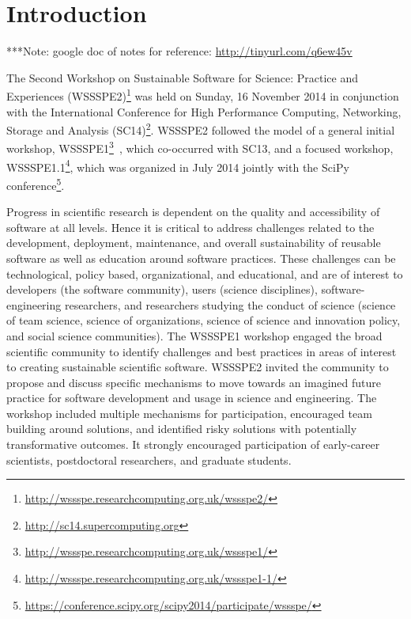 \documentclass[11pt, oneside]{amsart}
\newcommand{\note}[1]{ {\textcolor{blueish}    { ***Note:      #1 }}}
\newcommand{\katznote}[1]{ {\textcolor{magenta}    { ***Dan:      #1 }}}
\newcommand{\gabnote}[1]{ {\textcolor{cyan}    { ***Gabrielle:     #1 }}}
\newcommand{\nchnote}[1]{  {\textcolor{orange}      { ***Neil: #1 }}}
\newcommand{\manishnote}[1]{  {\textcolor{violet}     { ***Manish: #1 }}}
\newcommand{\davidnote}[1]{  {\textcolor{darkgreen}      { ***David: #1 }}}
\begin{document}
\maketitle


\section{Introduction}

%
%
%
%


\note{google doc of notes for reference: \url{http://tinyurl.com/q6ew45v}}

The Second Workshop on Sustainable Software for Science: Practice and
Experiences
(WSSSPE2)\footnote{\url{http://wssspe.researchcomputing.org.uk/wssspe2/}} was
held on Sunday, 16 November 2014 in conjunction with the International
Conference for High Performance Computing, Networking, Storage and Analysis
(SC14)\footnote{\url{http://sc14.supercomputing.org}}. WSSSPE2 followed the
model of a general initial workshop,
WSSSPE1\footnote{\url{http://wssspe.researchcomputing.org.uk/wssspe1/}}~\cite{WSSSPE1-pre-report,WSSSPE1},
which co-occurred with SC13, and a focused workshop,
WSSSPE1.1\footnote{\url{http://wssspe.researchcomputing.org.uk/wssspe1-1/}},
which was organized in July 2014 jointly with the SciPy 
conference\footnote{\url{https://conference.scipy.org/scipy2014/participate/wssspe/}}.

Progress in scientific research is dependent on the quality and accessibility of
software at all levels. Hence it is critical to address challenges related to
the development, deployment, maintenance, and overall sustainability of reusable
software as well as education around software practices. These challenges can be
technological, policy based, organizational, and educational, and are of
interest to developers (the software community), users (science disciplines),
software-engineering researchers, and researchers studying the conduct of
science (science of team science, science of organizations, science of science
and innovation policy, and social science communities). The WSSSPE1 workshop
engaged the broad scientific community to identify challenges and best practices
in areas of interest to creating sustainable scientific software. WSSSPE2
invited the community to propose and discuss specific mechanisms to move towards
an imagined future practice for software development and usage in science and
engineering. The workshop included multiple mechanisms for participation,
encouraged team building around solutions, and identified risky solutions with
potentially transformative outcomes. It strongly encouraged participation of
early-career scientists, postdoctoral researchers, and graduate students.
\end{document}
